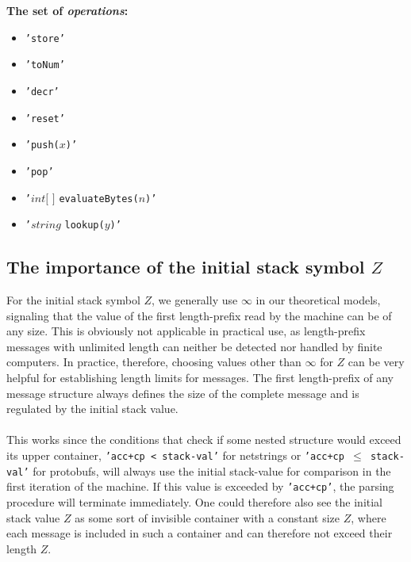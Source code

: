\vspace{10pt}
\textbf{The set of \textit{operations}:}
\begin{itemize}
    \item \texttt{'store'}
    \item \texttt{'toNum'}
    \item \texttt{'decr'}
    \item \texttt{'reset'}
    \item \texttt{'push($x$)'}
    \item \texttt{'pop'}
    \item \texttt{'}$int\big[$ $\big]$ \texttt{evaluateBytes($n$)'}
    \item \texttt{'}$string$ \texttt{lookup($y$)'}
\end{itemize}

\subsection{The importance of the initial stack symbol $Z$}
For the initial stack symbol $Z$, we generally use $\infty$ in our theoretical models, signaling that the value of the first length-prefix read by the machine can be of any size. This is obviously not applicable in practical use, as length-prefix messages with unlimited length can neither be detected nor handled by finite computers. In practice, therefore, choosing values other than $\infty$ for $Z$ can be very helpful for establishing length limits for messages. The first length-prefix of any message structure always defines the size of the complete message and is regulated by the initial stack value.\\\\ This works since the conditions that check if some nested structure would exceed its upper container, \texttt{'acc+cp < stack-val'} for netstrings or \texttt{'acc+cp $\leq$ stack-val'} for protobufs, will always use the initial stack-value for comparison in the first iteration of the machine. If this value is exceeded by \texttt{'acc+cp'}, the parsing procedure will terminate immediately. One could therefore also see the initial stack value $Z$ as some sort of invisible container with a constant size $Z$, where each message is included in such a container and can therefore not exceed their length $Z$.
